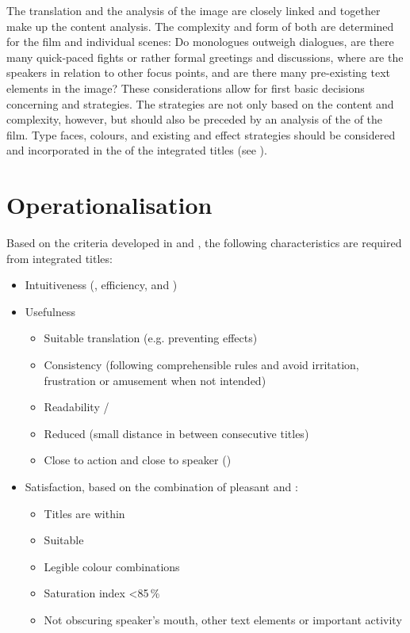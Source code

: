 The translation and the analysis of the image are closely linked and together make up the content analysis. The complexity and form of both are determined for the film and individual scenes: Do monologues outweigh dialogues, are there many quick-paced fights or rather formal greetings and discussions, where are the speakers in relation to other focus points, and are there many pre-existing text elements in the image? These considerations allow for first basic decisions concerning  and  strategies. The  strategies are not only based on the content and complexity, however, but should also be preceded by an analysis of the  of the film. Type faces, colours, and existing  and effect strategies should be considered and incorporated in the  of the integrated titles (see ).

\section{Operationalisation}\label{sec:5.2}

Based on the criteria developed in  and , the following characteristics are required from integrated titles:

\largerpage
\sloppy
\begin{itemize}
\item Intuitiveness (, efficiency, and )
\item Usefulness


\begin{itemize}
\item Suitable translation (e.g. preventing  effects)
\item Consistency (following comprehensible rules and avoid irritation, frustration or amusement when not intended)
\item Readability / 
\item Reduced  (small distance in between consecutive titles)
\item Close to action and close to speaker ()
\end{itemize}
\item Satisfaction, based on the combination of pleasant  and :


\begin{itemize}
\item Titles are within 
\item Suitable 
\item Legible colour combinations
\item Saturation index <85\,\%
\item Not obscuring speaker’s mouth, other text elements or important activity
\end{itemize}
\end{itemize}
\fussy

